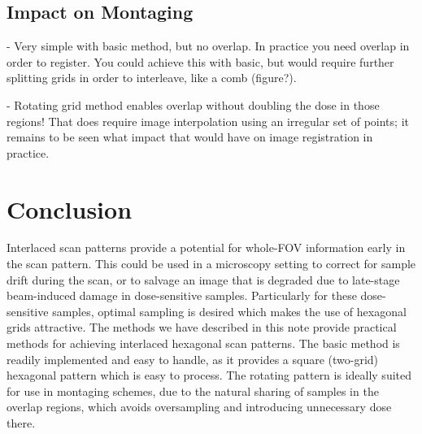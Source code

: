 \documentclass{article}
\begin{document}
\subsection{Impact on Montaging}
\label{sec:montaging}

- Very simple with basic method, but no overlap. In practice you need overlap in order to register. You could achieve this with basic, but would require further splitting grids in order to interleave, like a comb (figure?).

- Rotating grid method enables overlap without doubling the dose in those regions! That does require image interpolation using an irregular set of points; it remains to be seen what impact that would have on image registration in practice.

\section{Conclusion}
\label{sec:conclusion}

Interlaced scan patterns provide a potential for whole-FOV information early in the scan pattern.
%
This could be used in a microscopy setting to correct for sample drift during the scan, or to salvage an image that is degraded due to late-stage beam-induced damage in dose-sensitive samples.
%
Particularly for these dose-sensitive samples, optimal sampling is desired which makes the use of hexagonal grids attractive.
%
The methods we have described in this note provide practical methods for achieving interlaced hexagonal scan patterns.
%
The basic method is readily implemented and easy to handle, as it provides a square (two-grid) hexagonal pattern which is easy to process.
%
The rotating pattern is ideally suited for use in montaging schemes, due to the natural sharing of samples in the overlap regions, which avoids oversampling and introducing unnecessary dose there.



\end{document}
